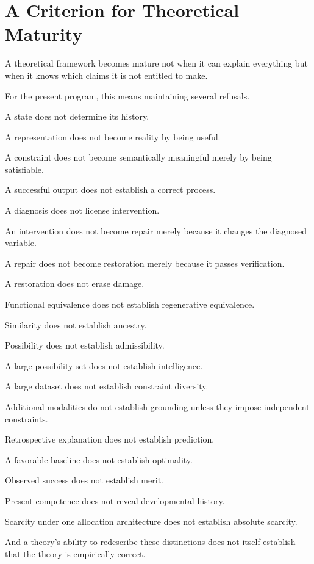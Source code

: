 \documentclass[11pt]{article}
\theoremstyle{remark}
\begin{document}
\section{A Criterion for Theoretical Maturity}

A theoretical framework becomes mature not when it can explain everything but when it knows which claims it is not entitled to make.

For the present program, this means maintaining several refusals.

A state does not determine its history.

A representation does not become reality by being useful.

A constraint does not become semantically meaningful merely by being satisfiable.

A successful output does not establish a correct process.

A diagnosis does not license intervention.

An intervention does not become repair merely because it changes the diagnosed variable.

A repair does not become restoration merely because it passes verification.

A restoration does not erase damage.

Functional equivalence does not establish regenerative equivalence.

Similarity does not establish ancestry.

Possibility does not establish admissibility.

A large possibility set does not establish intelligence.

A large dataset does not establish constraint diversity.

Additional modalities do not establish grounding unless they impose independent constraints.

Retrospective explanation does not establish prediction.

A favorable baseline does not establish optimality.

Observed success does not establish merit.

Present competence does not reveal developmental history.

Scarcity under one allocation architecture does not establish absolute scarcity.

And a theory's ability to redescribe these distinctions does not itself establish that the theory is empirically correct.
\end{document}
